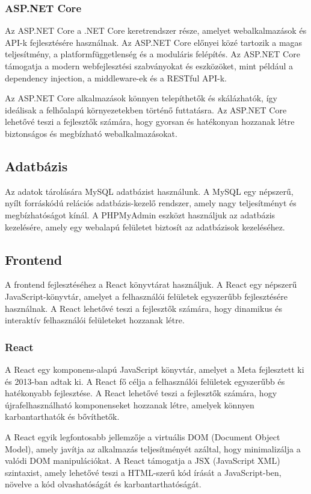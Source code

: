 \documentclass[colorlinks]{thesis-kando}
\theoremstyle{definition}
\theoremstyle{remark}
\begin{document}
\subsubsection{ASP.NET Core}
Az ASP.NET Core a .NET Core keretrendszer része, amelyet webalkalmazások és API-k fejlesztésére használnak. Az ASP.NET Core előnyei közé tartozik a magas teljesítmény, a platformfüggetlenség és a moduláris felépítés. Az ASP.NET Core támogatja a modern webfejlesztési szabványokat és eszközöket, mint például a dependency injection, a middleware-ek és a RESTful API-k.

Az ASP.NET Core alkalmazások könnyen telepíthetők és skálázhatók, így ideálisak a felhőalapú környezetekben történő futtatásra. Az ASP.NET Core lehetővé teszi a fejlesztők számára, hogy gyorsan és hatékonyan hozzanak létre biztonságos és megbízható webalkalmazásokat.

\subsection{Adatbázis}
Az adatok tárolására MySQL adatbázist használunk. A MySQL egy népszerű, nyílt forráskódú relációs adatbázis-kezelő rendszer, amely nagy teljesítményt és megbízhatóságot kínál. A PHPMyAdmin eszközt használjuk az adatbázis kezelésére, amely egy webalapú felületet biztosít az adatbázisok kezeléséhez.

\subsection{Frontend}
A frontend fejlesztéséhez a React könyvtárat használjuk. A React egy népszerű JavaScript-könyvtár, amelyet a felhasználói felületek egyszerűbb fejlesztésére használnak. A React lehetővé teszi a fejlesztők számára, hogy dinamikus és interaktív felhasználói felületeket hozzanak létre.

\subsubsection{React}
A React egy komponens-alapú JavaScript könyvtár, amelyet a Meta fejlesztett ki és 2013-ban adtak ki. A React fő célja a felhasználói felületek egyszerűbb és hatékonyabb fejlesztése. A React lehetővé teszi a fejlesztők számára, hogy újrafelhasználható komponenseket hozzanak létre, amelyek könnyen karbantarthatók és bővíthetők.

A React egyik legfontosabb jellemzője a virtuális DOM (Document Object Model), amely javítja az alkalmazás teljesítményét azáltal, hogy minimalizálja a valódi DOM manipulációkat. A React támogatja a JSX (JavaScript XML) szintaxist, amely lehetővé teszi a HTML-szerű kód írását a JavaScript-ben, növelve a kód olvashatóságát és karbantarthatóságát.
\end{document}
